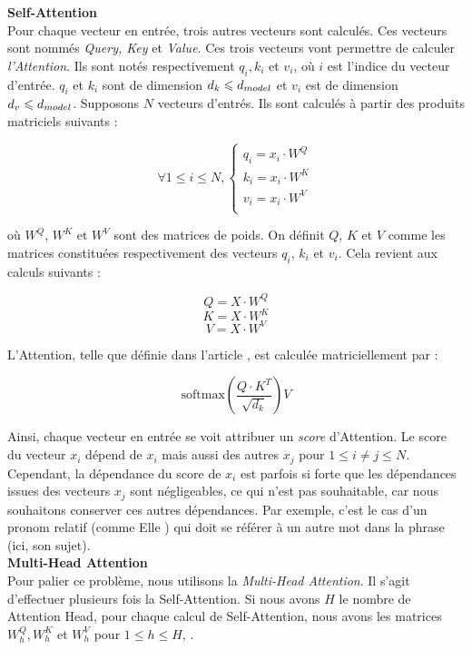 \textbf{Self-Attention} \\

Pour chaque vecteur en entrée, trois autres vecteurs sont calculés. Ces vecteurs sont nommés \textit{Query, Key} et \textit{Value}.
Ces trois vecteurs vont permettre de calculer \textit{l'Attention}.
Ils sont notés respectivement $q_i, k_i$ et $v_i$, où $i$ est l'indice du vecteur d'entrée. $q_i$ et $k_i$ sont de dimension
$d_k \leqslant d_{model}$ et $v_i$ est de dimension $d_v \leqslant d_{model}$.
Supposons $N$ vecteurs d'entrés. Ils sont calculés à partir des produits matriciels suivants :

\[ \forall 1 \leq i \leq N,
  \begin{cases}
  q_i = x_i \cdot W^Q \\
  k_i = x_i \cdot W^K \\
  v_i = x_i \cdot W^V \\
  \end{cases}  \]

\noindent{}où $W^Q$, $W^K$ et $W^V$ sont des matrices de poids. On définit $Q$, $K$ et $V$ comme les matrices constituées respectivement des vecteurs $q_i$, $k_i$ et $v_i$.
Cela revient aux calculs suivants :

\[ Q = X \cdot W^Q  \]
\[ K = X \cdot W^K  \]
\[ V = X \cdot W^V  \]

L'Attention, telle que définie dans l'article \cite{vaswani2017attention}, est calculée matriciellement par :

\[ \text{softmax}\left( \frac{Q \cdot K^T}{\sqrt{d_k}} \right) V \]

Ainsi, chaque vecteur en entrée se voit attribuer un \textit{score} d'Attention. Le score du vecteur $x_i$ dépend de $x_i$ mais
aussi des autres $x_j$ pour $1 \leq i \neq j \leq N$. Cependant, la dépendance du score de $x_i$ est parfois si forte que les
dépendances issues des vecteurs $x_j$ sont négligeables, ce qui n'est pas souhaitable, car nous souhaitons
conserver ces autres dépendances. Par exemple, c'est le cas d'un pronom relatif (comme \og Elle \fg{}) qui doit se référer
à un autre mot dans la phrase (ici, son sujet). \\

\textbf{Multi-Head Attention} \\

Pour palier ce problème, nous utilisons la \textit{Multi-Head Attention}. Il s'agit d'effectuer
plusieurs fois la Self-Attention. Si nous avons $H$ le nombre de Attention Head,
pour chaque calcul de Self-Attention, nous avons les matrices
$W_h^Q, W_h^K$ et $W_h^V$ pour $1 \leq h \leq H$, .


